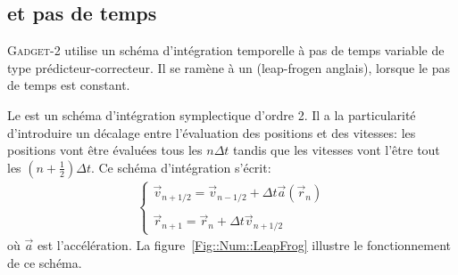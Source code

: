 		\subsection{\og\Sm\fg et pas de temps}

			\textsc{Gadget-2} utilise un schéma d'intégration temporelle à pas de temps variable de type  \og{}prédicteur-correcteur\fg.
			Il se ramène à un \sm (\og{}leap-frog\fg en anglais), lorsque le pas de temps est constant. %

			Le \sm est un schéma d'intégration symplectique d'ordre 2. Il a la particularité d'introduire un décalage entre l'évaluation des positions et
			des vitesses: les positions vont être évaluées tous les $n\Delta t$ tandis que les vitesses vont l'être tout les
			$(n+\frac{1}{2})\Delta t$. Ce schéma d'intégration s'écrit:
			\begin{align*}
				\begin{cases}
					\vec{v}_{n+1/2} = \vec{v}_{n-1/2} + \Delta t\vec{a}(\vec{r}_n) \\
					\\
					\vec{r}_{n+1} = \vec{r}_n +\Delta t\vec{v}_{n+1/2}
				\end{cases}
			\end{align*}
			où $\vec{a}$ est l'accélération. La figure~\ref{Fig::Num::LeapFrog} illustre le fonctionnement de ce
			schéma.

